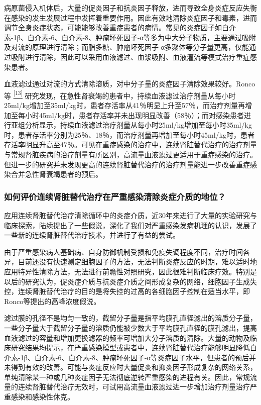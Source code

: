 病原菌侵入机体后，大量的促炎因子和抗炎因子释放，进而导致全身炎症反应失衡在感染的发生发展过程中发挥着重要作用。因此有效地清除炎症因子和毒素，进而调节全身炎症状态，可能能够改善重症患者的病情。常见的炎症因子如白介素-1β、白介素-6、白介素-8、肿瘤坏死因子-α等多为中大分子物质，主要通过吸附及对流的原理进行清除；而脂多糖、肿瘤坏死因子-α多聚体等分子量更高，仅能通过吸附进行清除，因此可以采用血液滤过、血浆吸附、血液灌流等模式治疗重症感染患者。

血液滤过通过对流的方式清除溶质，对中分子量的炎症因子清除效果较好。Ronco等
\protect\hyperlink{text00018.htmlux5cux23ch13-17}{\textsuperscript{{[}13{]}}}
研究发现，在急性肾衰竭的患者中，持续血液滤过治疗剂量从每小时25ml/kg增加至35ml/kg时，患者存活率从41％明显上升至57％，而治疗剂量再增加至每小时45ml/kg时，患者存活率并未出现明显改善（58％）；而对感染患者进行亚组分析显示，持续血液滤过治疗剂量从每小时25ml/kg增加至每小时35ml/kg时，患者存活率分别为25％、18％，而治疗剂量再增加至每小时45ml/kg时，患者存活率明显升高至47％。可见在重症感染的治疗中，连续肾脏替代治疗的治疗剂量与常规肾脏疾病的治疗剂量有所区别，高流量血液滤过更适用于重症感染的治疗。但进一步的研究并未发现更高的连续肾脏替代治疗的治疗剂量能进一步改善重症感染合并急性肾衰竭患者的预后。

\subsubsection{如何评价连续肾脏替代治疗在严重感染清除炎症介质的地位？}

应用连续肾脏替代治疗清除循环中的炎症介质，近30年来进行了大量的实验研究与临床探索，陆续提出了一些假说，深化了我们对严重感染发病机理的认识，发展了一些新的连续肾脏替代治疗技术，并进行了有益的尝试。

由于严重感染病人基础病、自身防御机制受损和免疫失调程度不同，治疗时间各异，目前还没有快速测定细胞因子的方法，无法判断炎症反应的时期，难以适时地应用特异性清除方法，无法进行前瞻性对照研究，因此很难判断临床疗效。特别是以后的研究认为，促炎症介质与抗炎症介质之间形成复杂的网络，细胞因子生成失控，连续肾脏替代治疗的目的是将失控的过高的各细胞因子控制在适当水平，即Ronco等提出的高峰浓度假说。

滤过膜的孔径不是均匀一致的，截留分子量是指平均膜孔直径滤出的溶质分子量，一些分子量大于截留分子量的溶质仍能被少数大于平均膜孔直径的膜孔滤出，提高血液滤过的容量和增加更换滤器的频率可增加大分子溶质的清除。大量的动物及临床研究结果均提示，在严重感染模型或患者中，连续肾脏替代治疗能够明显降低白介素-1β、白介素-6、白介素-8、肿瘤坏死因子-α等炎症因子水平，但患者的预后并未得到有效的改善。可能与炎症反应时大量促炎和抑炎因子形成复杂的网络关系，单纯清除某一种或几种炎症因子无法彻底逆转严重感染的进程有关。因此，常规流量的连续肾脏替代治疗无效时，可试用高流量血液滤过进一步增加治疗剂量治疗严重感染和感染性休克。

